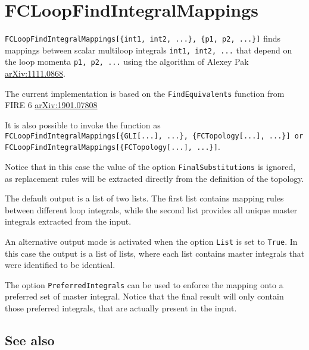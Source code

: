 \documentclass[../FeynCalcManual.tex]{subfiles}
\begin{document}
\hypertarget{fcloopfindintegralmappings}{
\section{FCLoopFindIntegralMappings}\label{fcloopfindintegralmappings}}

\texttt{FCLoopFindIntegralMappings[\allowbreak{}\{\allowbreak{}int1,\ \allowbreak{}int2,\ \allowbreak{}...\},\ \allowbreak{}\{\allowbreak{}p1,\ \allowbreak{}p2,\ \allowbreak{}...\}]}
finds mappings between scalar multiloop integrals
\texttt{int1,\ \allowbreak{}int2,\ \allowbreak{}...} that depend on the
loop momenta \texttt{p1,\ \allowbreak{}p2,\ \allowbreak{}...} using the
algorithm of Alexey Pak
\href{https://arxiv.org/abs/1111.0868}{arXiv:1111.0868}.

The current implementation is based on the \texttt{FindEquivalents}
function from FIRE 6
\href{https://arxiv.org/abs/1901.07808}{arXiv:1901.07808}

It is also possible to invoke the function as
\texttt{FCLoopFindIntegralMappings[\allowbreak{}\{\allowbreak{}GLI[\allowbreak{}...],\ \allowbreak{}...\},\ \allowbreak{}\{\allowbreak{}FCTopology[\allowbreak{}...],\ \allowbreak{}...\}] or FCLoopFindIntegralMappings[\allowbreak{}\{\allowbreak{}FCTopology[\allowbreak{}...],\ \allowbreak{}...\}]}.

Notice that in this case the value of the option
\texttt{FinalSubstitutions} is ignored, as replacement rules will be
extracted directly from the definition of the topology.

The default output is a list of two lists. The first list contains
mapping rules between different loop integrals, while the second list
provides all unique master integrals extracted from the input.

An alternative output mode is activated when the option \texttt{List} is
set to \texttt{True}. In this case the output is a list of lists, where
each list contains master integrals that were identified to be
identical.

The option \texttt{PreferredIntegrals} can be used to enforce the
mapping onto a preferred set of master integral. Notice that the final
result will only contain those preferred integrals, that are actually
present in the input.

\subsection{See also}
\end{document}
